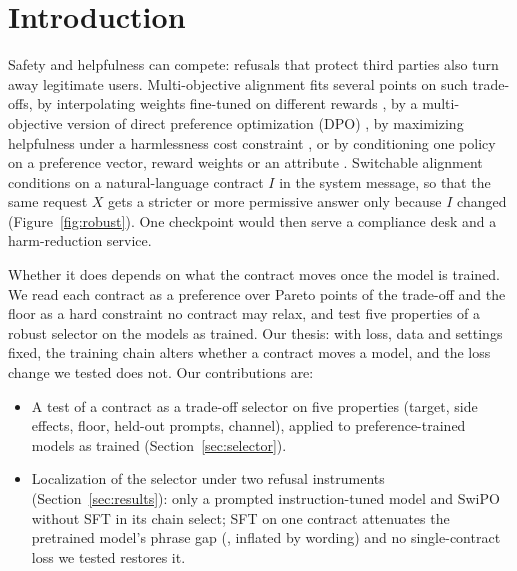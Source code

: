 \documentclass[letterpaper]{article} %
\begin{document}
\section{Introduction}

Safety and helpfulness can compete: refusals that protect third parties also turn away legitimate users. Multi-objective alignment fits several points on such trade-offs, by interpolating weights fine-tuned on different rewards \cite{rame2023rewarded}, by a multi-objective version of direct preference optimization (DPO) \cite{rafailov2023direct,zhou2024modpo}, by maximizing helpfulness under a harmlessness cost constraint \cite{dai2024safe}, or by conditioning one policy on a preference vector, reward weights or an attribute \cite{zhong2024panacea,yang2024rewards,guo2024controllable,wang-etal-2024-arithmetic,dong2023steerlm}. Switchable alignment conditions on a natural-language contract $I$ in the system message, so that the same request $X$ gets a stricter or more permissive answer only because $I$ changed (Figure~\ref{fig:robust}). One checkpoint would then serve a compliance desk and a harm-reduction service.


Whether it does depends on what the contract moves once the model is trained. We read each contract as a preference over Pareto points of the trade-off and the floor as a hard constraint no contract may relax, and test five properties of a robust selector on the models as trained. Our thesis: with loss, data and settings fixed, the training chain alters whether a contract moves a model, and the loss change we tested does not. Our contributions are:
\begin{itemize}
    \item A test of a contract as a trade-off selector on five properties (target, side effects, floor, held-out prompts, channel), applied to preference-trained models as trained (Section~\ref{sec:selector}).
    \item Localization of the selector under two refusal instruments (Section~\ref{sec:results}): only a prompted instruction-tuned model and SwiPO without SFT in its chain select; SFT on one contract attenuates the pretrained model's phrase gap (\nBaseGap{}, inflated by wording) and no single-contract loss we tested restores it.
\end{itemize}
\end{document}
